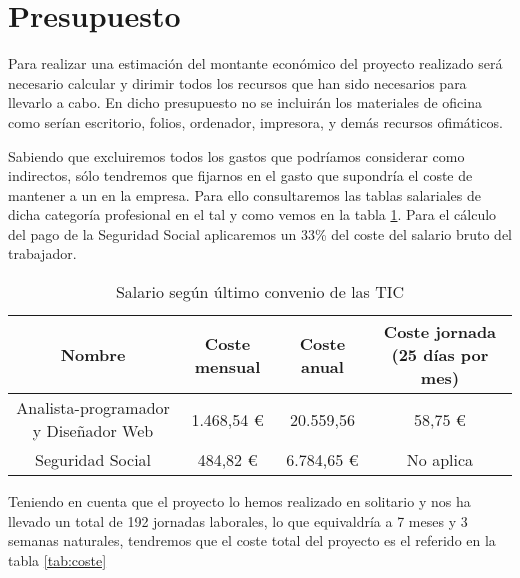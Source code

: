 \section{Presupuesto}

Para realizar una estimación del montante económico del proyecto realizado será
necesario calcular y dirimir todos los recursos que han sido necesarios para
llevarlo a cabo. En dicho presupuesto no se incluirán los materiales de oficina
como serían escritorio, folios, ordenador, impresora, y demás recursos
ofimáticos.

Sabiendo que excluiremos todos los gastos que podríamos considerar como
indirectos, sólo tendremos que fijarnos en el gasto que supondría el coste de
mantener a un  en la
empresa. Para ello consultaremos las tablas salariales de dicha categoría
profesional en el  tal
y como vemos en la tabla \ref{tab:salario}. Para el cálculo del pago de la
Seguridad Social aplicaremos un 33\% del coste del salario bruto del trabajador.

\begin{table}[H]
  \begin{center}
    \begin{tabular}{| c | c | c | c |}
      \hline
      Nombre & Coste mensual & Coste anual & Coste jornada (25 días por mes)\\ \hline
      Analista-programador y Diseñador Web & 1.468,54 \euro & 20.559,56
      & 58,75 \euro\\ \hline
      Seguridad Social & 484,82 \euro & 6.784,65 \euro & No aplica \\
      \hline
    \end{tabular}
  \end{center}
  \caption{Salario según último convenio de las TIC}
  \label{tab:salario}
\end{table}


Teniendo en cuenta que el proyecto lo hemos realizado en solitario y nos ha
llevado un total de 192 jornadas laborales, lo que equivaldría a 7 meses y 3
semanas naturales, tendremos que el coste total del proyecto es el referido en
la tabla \ref{tab:coste}

